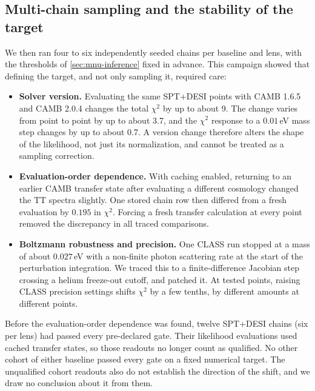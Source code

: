 \documentclass[11pt]{article}
\theoremstyle{remark}
\numberwithin{equation}{section}
\begin{document}
\subsection{Multi-chain sampling and the stability of the target}
We then ran four to six independently seeded chains per baseline and lens, with the thresholds of \cref{sec:mnu-inference} fixed in advance. This campaign showed that defining the target, and not only sampling it, required care:
\begin{itemize}[leftmargin=*, itemsep=2pt]
  \item \textbf{Solver version.} Evaluating the same SPT+DESI points with CAMB 1.6.5 and CAMB 2.0.4 changes the total $\chi^2$ by up to about 9. The change varies from point to point by up to about 3.7, and the $\chi^2$ response to a $0.01$\,eV mass step changes by up to about 0.7. A version change therefore alters the shape of the likelihood, not just its normalization, and cannot be treated as a sampling correction.
  \item \textbf{Evaluation-order dependence.} With caching enabled, returning to an earlier CAMB transfer state after evaluating a different cosmology changed the TT spectra slightly. One stored chain row then differed from a fresh evaluation by $0.195$ in $\chi^2$. Forcing a fresh transfer calculation at every point removed the discrepancy in all traced comparisons.
  \item \textbf{Boltzmann robustness and precision.} One CLASS run stopped at a mass of about $0.027$\,eV with a non-finite photon scattering rate at the start of the perturbation integration. We traced this to a finite-difference Jacobian step crossing a helium freeze-out cutoff, and patched it. At tested points, raising CLASS precision settings shifts $\chi^2$ by a few tenths, by different amounts at different points.
\end{itemize}
Before the evaluation-order dependence was found, twelve SPT+DESI chains (six per lens) had passed every pre-declared gate. Their likelihood evaluations used cached transfer states, so those readouts no longer count as qualified. No other cohort of either baseline passed every gate on a fixed numerical target. The unqualified cohort readouts also do not establish the direction of the shift, and we draw no conclusion about it from them.
\end{document}

